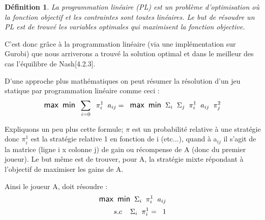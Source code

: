 \documentclass[a4paper, 12pt, twoside]{article}
\newtheorem{definition}{Définition}
\begin{document}
{\begin{definition}
La programmation linéaire (PL) est un problème d'optimisation où la fonction objectif et les contraintes sont toutes linéaires. Le but de résoudre un PL est de trouvé les variables optimales qui maximisent la fonction objective.
\end{definition}

C'est donc grâce à la \textsf{programmation linéaire} (via une implémentation sur \textsf{Gurobi}) que nous arriverons a trouvé la solution optimal et dans le meilleur des cas \textsf{l'équilibre de Nash}[4.2.3]. \newline

D'une approche plus mathématiques on peut résumer la résolution d'un \textsf{jeu statique} par \textsf{programmation linéaire} comme ceci : \newline
\begin{align*}
\large \textsf{max} \hspace{0,2 cm} \textsf{min} \hspace{0,2 cm} \sum_{i=0}\hspace{0,2 cm} \pi_{i}^{1}\hspace{0,2 cm} a _{ij}  =\hspace{0,2 cm} \textsf{max} \hspace{0,2 cm} \textsf{min} \hspace{0,2 cm}\Sigma _{i}\hspace{0,2 cm} \Sigma _{j}\hspace{0,2 cm} \pi_{i}^{1}\hspace{0,2 cm} a _{ij} \hspace{0,2 cm} \pi_{j}^{2} 
\end{align*}

Expliquons un peu plus cette formule; $ \pi $ est un probabilité relative à une stratégie donc 
$\pi_{i}^{1}$ est la stratégie relative 1 en fonction de i (etc...), quand à a$ _{ij} $ il s'agit de la matrice (ligne \textsf{i} x colonne \textsf{j}) de gain ou récompense de A (donc du premier joueur).  Le but même est de trouver, pour A, la stratégie mixte répondant à l'objectif de maximiser les gains de A. \newline

Ainsi le joueur A, doit résoudre :
\begin{align*}
\large {\textsf{max} \hspace{0.2 cm} \textsf{min} \hspace{0.2 cm} \Sigma_{i}\hspace{0.2 cm} \pi_{i}^{1}\hspace{0.2 cm} a _{ij} } \\ s.c \hspace{0,4 cm}
\large {\Sigma_{i}\hspace{0,2 cm}\pi_{i}^{1} = \hspace{0,2 cm}1}
\end{align*}
}
\end{document}
